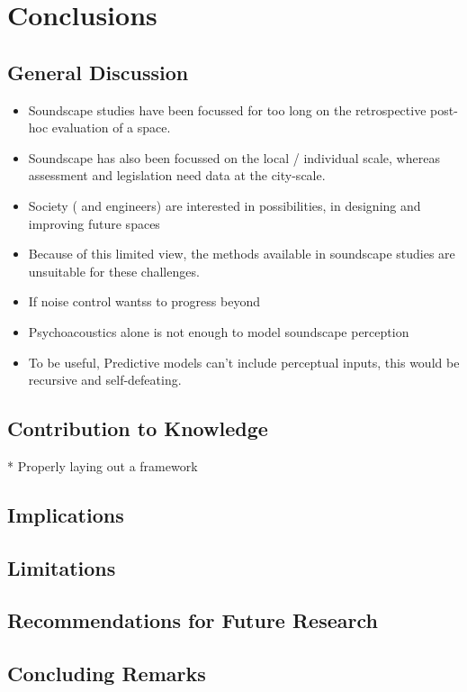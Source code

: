 \chapter{Conclusions}
\label{ch:conc}

\section{General Discussion}
\begin{itemize}
  \item Soundscape studies have been focussed for too long on the retrospective post-hoc evaluation of a space.
  \item Soundscape has also been focussed on the local / individual scale, whereas assessment and legislation need data at the city-scale.
  \item Society ( and engineers) are interested in possibilities, in designing and improving future spaces
  \item Because of this limited view, the methods available in soundscape studies are unsuitable for these challenges.
  \item If noise control wantss to progress beyond
  \item Psychoacoustics alone is not enough to model soundscape perception
  \item To be useful, Predictive models can't include perceptual inputs, this would be recursive and self-defeating.
\end{itemize}


\section{Contribution to Knowledge}
* Properly laying out a framework 

\section{Implications}

\section{Limitations}

\section{Recommendations for Future Research}

\section{Concluding Remarks}